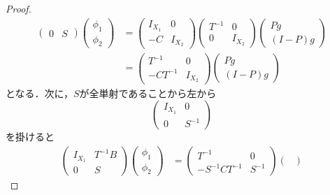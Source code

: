 \documentclass[11pt,a4paper,titlepage]{jsreport}
\theoremstyle{definition}
\begin{document}
\begin{proof}
\begin{equation}
\begin{split}
\begin{pmatrix}
        0 & S
      \end{pmatrix}
      \begin{pmatrix}
        \phi_1 \\
        \phi_2
      \end{pmatrix}
      &=
      \begin{pmatrix}
        I_{X_1} & 0 \\
        -C & I_{X_2}
      \end{pmatrix}
      \begin{pmatrix}
        T^{-1} & 0 \\
        0 & I_{X_2}
      \end{pmatrix}
      \begin{pmatrix}
        Pg \\
        (I-P)g
      \end{pmatrix}\\
      &=
      \begin{pmatrix}
        T^{-1} & 0 \\
        -CT^{-1} & I_{X_2}
      \end{pmatrix}
      \begin{pmatrix}
        Pg \\
        (I-P)g
      \end{pmatrix}
    \end{split}
  \end{equation}
  となる．次に，$S$が全単射であることから左から
  \begin{equation*}
    \begin{pmatrix}
      I_{X_1} & 0 \\
      0 & S^{-1}
    \end{pmatrix}
  \end{equation*}
  を掛けると
  \begin{equation*}
    \begin{split}
      \begin{pmatrix}
        I_{X_1} & T^{-1}B \\
        0 & S
      \end{pmatrix}
      \begin{pmatrix}
        \phi_1 \\
        \phi_2
      \end{pmatrix}
      &=
      \begin{pmatrix}
        T^{-1} & 0 \\
        -S^{-1}CT^{-1} & S^{-1}
      \end{pmatrix}
      \begin{pmatrix}

\end{pmatrix}
\end{split}
\end{equation*}
\end{proof}
\end{document}
